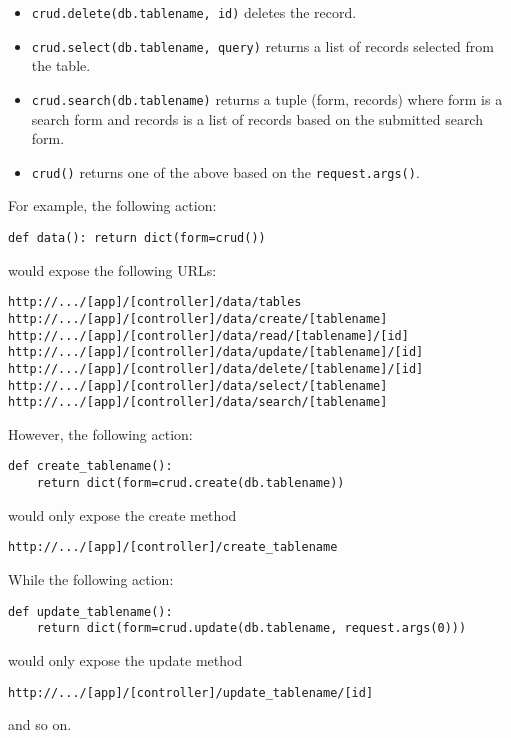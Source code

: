 \documentclass[justified,sixbynine,notoc]{tufte-book}
\def\ft{\small\tt}
\begin{document}
\begin{fullwidth}
\begin{itemize}
\item {\ft crud.delete(db.tablename, id)} deletes the record.

\item {\ft crud.select(db.tablename, query)} returns a list of records selected from the table.

\item {\ft crud.search(db.tablename)} returns a tuple (form, records) where form is a search form and records is a list of records based on the submitted search form.

\item {\ft crud()} returns one of the above based on the {\ft request.args()}.
\end{itemize}

For example, the following action:
\begin{lstlisting}
def data(): return dict(form=crud())
\end{lstlisting}
\noindent would expose the following URLs:
\begin{lstlisting}[keywords={}]
http://.../[app]/[controller]/data/tables
http://.../[app]/[controller]/data/create/[tablename]
http://.../[app]/[controller]/data/read/[tablename]/[id]
http://.../[app]/[controller]/data/update/[tablename]/[id]
http://.../[app]/[controller]/data/delete/[tablename]/[id]
http://.../[app]/[controller]/data/select/[tablename]
http://.../[app]/[controller]/data/search/[tablename]
\end{lstlisting}

However, the following action:

\begin{lstlisting}
def create_tablename():
    return dict(form=crud.create(db.tablename))
\end{lstlisting}
\noindent would only expose the create method

\begin{lstlisting}[keywords={}]
http://.../[app]/[controller]/create_tablename
\end{lstlisting}

While the following action:

\begin{lstlisting}
def update_tablename():
    return dict(form=crud.update(db.tablename, request.args(0)))
\end{lstlisting}
\noindent would only expose the update method

\begin{lstlisting}[keywords={}]
http://.../[app]/[controller]/update_tablename/[id]
\end{lstlisting}
\noindent and so on.


\end{fullwidth}
\end{document}
